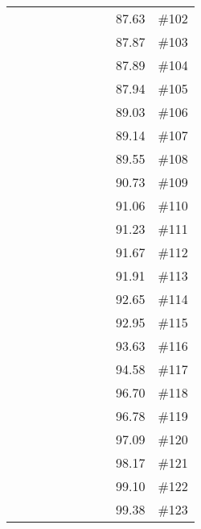 \begin{longtable}{|c|c|c|c|c|c|c|c|c|c|}
 \x    & \x    & \x    &       &       & \x    &       & \x\m  & 87.63 & \#102 \\
 \x    & \x    & \x    & \x    &       & \x\m  & \x\m  &       & 87.87 & \#103 \\
 \x    & \x    &       &       &       & \x    &       &       & 87.89 & \#104 \\
 \x    & \x    &       & \x    &       &       &       &       & 87.94 & \#105 \\
 \x    & \x    &       &       &       &       &       &       & 89.03 & \#106 \\
 \x    & \x    & \x    &       &       & \x    & \x\m  &       & 89.14 & \#107 \\
 \x    & \x    & \x    & \x    &       &       &       & \x    & 89.55 & \#108 \\
 \x    & \x    &       &       & \x    & \x    & \x    &       & 90.73 & \#109 \\
 \x    & \x    &       & \x    & \x\m  &       &       &       & 91.06 & \#110 \\
 \x    & \x    &       &       & \x\m  &       &       &       & 91.23 & \#111 \\
 \x    & \x    &       &       &       &       &       & \x\m  & 91.67 & \#112 \\
 \x    & \x    & \x    &       &       & \x\m  &       & \x\m  & 91.91 & \#113 \\
 \x    & \x    & \x    &       &       & \x\m  & \x\m  &       & 92.65 & \#114 \\
 \x    & \x    &       & \x    & \x    & \x    &       & \x    & 92.95 & \#115 \\
 \x    & \x    & \x    &       &       &       & \x\m  &       & 93.63 & \#116 \\
 \x    & \x    & \x    &       &       & \x\m  & \x    &       & 94.58 & \#117 \\
 \x    & \x    &       &       &       &       &       & \x    & 96.70 & \#118 \\
 \x    & \x    &       &       &       & \x\m  &       &       & 96.78 & \#119 \\
 \x    & \x    &       &       & \x    &       &       & \x    & 97.09 & \#120 \\
 \x    & \x    &       & \x    & \x    & \x    & \x    &       & 98.17 & \#121 \\
 \x    & \x    &       &       & \x    & \x    &       & \x    & 99.10 & \#122 \\
 \x    & \x    &       &       &       &       & \x    &       & 99.38 & \#123 \\

\end{longtable}
